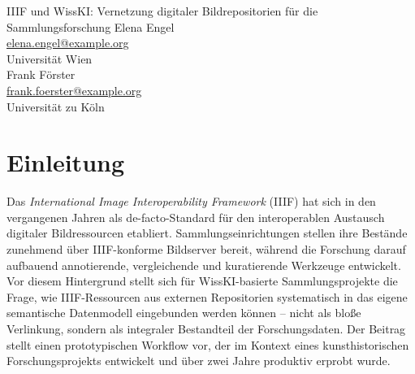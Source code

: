 \graphicspath{{abstracts/praesentationen/03-iiif-vernetzung/img/}{img/}}

\begin{beitrag}{IIIF und WissKI: Vernetzung digitaler Bildrepositorien für die Sammlungsforschung}{%
Elena Engel\, \\
\small \href{mailto:elena.engel@example.org}{elena.engel@example.org} \\
\small Universität Wien \\[0.5cm]
Frank Förster\, \\
\small \href{mailto:frank.foerster@example.org}{frank.foerster@example.org} \\
\small Universität zu Köln
}

\begin{abstract}
Der Beitrag stellt einen prototypischen Workflow vor, der IIIF-Bildressourcen aus externen Repositorien über eine schlanke Vermittlungsschicht systematisch in ein WissKI-basiertes semantisches Datenmodell integriert: Manifest-Metadaten werden auf CIDOC-CRM-konforme Klassen abgebildet, während aus WissKI-Entitäten dynamisch IIIF-Manifeste erzeugt werden. Die Beispielanwendung verknüpft Bestände aus drei Quellen ausschließlich über externe IIIF-URIs ohne lokale Bildhaltung; als besondere Herausforderungen erwiesen sich die Heterogenität realer IIIF-Manifeste und die Langzeitstabilität externer Endpunkte, weshalb eine projektseitige Resolver-Schicht empfohlen wird. Die entwickelte Architektur wird als Open-Source-Veröffentlichung der Community zugänglich gemacht.
\end{abstract}

\section{Einleitung}
Das \emph{International Image Interoperability Framework} (IIIF) hat sich in den vergangenen Jahren als de-facto-Standard für den interoperablen Austausch digitaler Bildressourcen etabliert. Sammlungseinrichtungen stellen ihre Bestände zunehmend über IIIF-konforme Bildserver bereit, während die Forschung darauf aufbauend annotierende, vergleichende und kuratierende Werkzeuge entwickelt. Vor diesem Hintergrund stellt sich für WissKI-basierte Sammlungsprojekte die Frage, wie IIIF-Ressourcen aus externen Repositorien systematisch in das eigene semantische Datenmodell eingebunden werden können -- nicht als bloße Verlinkung, sondern als integraler Bestandteil der Forschungsdaten. Der Beitrag stellt einen prototypischen Workflow vor, der im Kontext eines kunsthistorischen Forschungsprojekts entwickelt und über zwei Jahre produktiv erprobt wurde.


\end{beitrag}
